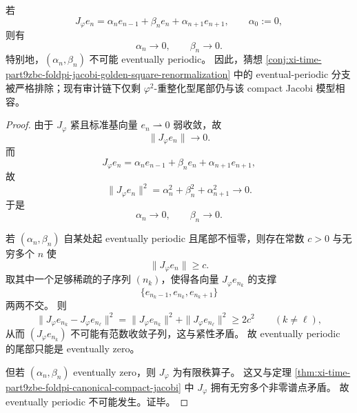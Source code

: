 \begin{corollary}\label{cor:xi-time-part9zbe-foldpi-jacobi-vanishing-no-periodic-tail}
若
\[
J_\varphi e_n=\alpha_n e_{n-1}+\beta_n e_n+\alpha_{n+1}e_{n+1},
\qquad
\alpha_0:=0,
\]
则有
\[
\alpha_n\longrightarrow 0,
\qquad
\beta_n\longrightarrow 0.
\]
特别地，\((\alpha_n,\beta_n)\) 不可能 eventually periodic。
因此，猜想 \ref{conj:xi-time-part9zbc-foldpi-jacobi-golden-square-renormalization} 中的 eventual-periodic 分支被严格排除；现有审计链下仅剩 \(\varphi^2\)-重整化型尾部仍与该 compact Jacobi 模型相容。
\end{corollary}
\begin{proof}
由于 \(J_\varphi\) 紧且标准基向量 \(e_n\rightharpoonup 0\) 弱收敛，故
\[
\|J_\varphi e_n\|\to 0.
\]
而
\[
J_\varphi e_n=\alpha_n e_{n-1}+\beta_n e_n+\alpha_{n+1}e_{n+1},
\]
故
\[
\|J_\varphi e_n\|^2=\alpha_n^2+\beta_n^2+\alpha_{n+1}^2\longrightarrow 0.
\]
于是
\[
\alpha_n\to 0,
\qquad
\beta_n\to 0.
\]

若 \((\alpha_n,\beta_n)\) 自某处起 eventually periodic 且尾部不恒零，则存在常数 \(c>0\) 与无穷多个 \(n\) 使
\[
\|J_\varphi e_n\|\ge c.
\]
取其中一个足够稀疏的子序列 \((n_k)\)，使得各向量 \(J_\varphi e_{n_k}\) 的支撑
\[
\{e_{n_k-1},e_{n_k},e_{n_k+1}\}
\]
两两不交。
则
\[
\|J_\varphi e_{n_k}-J_\varphi e_{n_\ell}\|^2
=
\|J_\varphi e_{n_k}\|^2+\|J_\varphi e_{n_\ell}\|^2
\ge
2c^2
\qquad (k\neq \ell),
\]
从而 \((J_\varphi e_{n_k})\) 不可能有范数收敛子列，这与紧性矛盾。
故 eventually periodic 的尾部只能是 eventually zero。

但若 \((\alpha_n,\beta_n)\) eventually zero，则 \(J_\varphi\) 为有限秩算子。
这又与定理 \ref{thm:xi-time-part9zbe-foldpi-canonical-compact-jacobi} 中 \(J_\varphi\) 拥有无穷多个非零谱点矛盾。
故 eventually periodic 不可能发生。证毕。
\end{proof}

